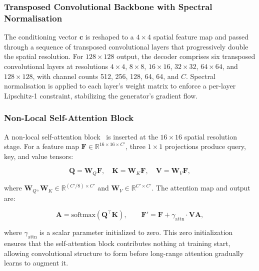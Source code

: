 \documentclass[12pt,letterpaper]{article}
\newcommand{\bc}{\mathbf{c}}
\newcommand{\RR}{\mathbb{R}}
\begin{document}
\subsubsection{Transposed Convolutional Backbone with Spectral Normalisation}

The conditioning vector $\bc$ is reshaped to a $4 \times 4$ spatial feature
map and passed through a sequence of transposed convolutional layers that
progressively double the spatial resolution.  For $128 \times 128$ output,
the decoder comprises six transposed convolutional layers at resolutions
$4 \times 4$, $8 \times 8$, $16 \times 16$, $32 \times 32$,
$64 \times 64$, and $128 \times 128$, with channel counts 512, 256, 128,
64, 64, and $C$.  Spectral normalisation is applied to each layer's weight
matrix to enforce a per-layer Lipschitz-1 constraint, stabilizing the
generator's gradient flow.

\subsubsection{Non-Local Self-Attention Block}

A non-local self-attention block~\cite{zhang2019,wang2018} is inserted at the
$16 \times 16$ spatial resolution stage.  For a feature map
$\mathbf{F} \in \RR^{16 \times 16 \times C'}$, three $1 \times 1$
projections produce query, key, and value tensors:

\begin{equation}
  \mathbf{Q} = \mathbf{W}_Q \mathbf{F}, \quad
  \mathbf{K} = \mathbf{W}_K \mathbf{F}, \quad
  \mathbf{V} = \mathbf{W}_V \mathbf{F},
  \label{eq:qkv}
\end{equation}

where $\mathbf{W}_Q, \mathbf{W}_K \in \RR^{(C'/8) \times C'}$ and
$\mathbf{W}_V \in \RR^{C' \times C'}$.  The attention map and output are:

\begin{equation}
  \mathbf{A} = \text{softmax}\!\left(\mathbf{Q}^\top \mathbf{K}\right),
  \qquad
  \mathbf{F}' = \mathbf{F} + \gamma_{\text{attn}} \cdot \mathbf{V}\mathbf{A},
  \label{eq:attn_out}
\end{equation}

where $\gamma_{\text{attn}}$ is a scalar parameter initialized to zero.
This zero initialization ensures that the self-attention block contributes
nothing at training start, allowing convolutional structure to form before
long-range attention gradually learns to augment it.
\end{document}
